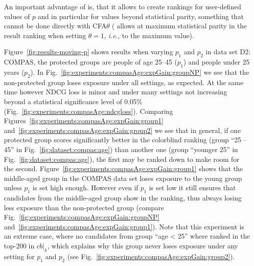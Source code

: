 
%
An important advantage of \algoFAIR is, that it allows to create rankings for user-defined values of $p$ and in particular for values beyond statistical parity, something that cannot be done directly with CFA$\theta$ (\citet{zehlike2020matching} allows at maximum statistical parity in the result ranking when setting $\theta=1$, {\it i.e.}, to the maximum value).

Figure~\ref{fig:results-moving-p} shows results when varying $p_1$ and $p_2$ in data set D2: COMPAS, the protected groups are people of age 25--45 ($p_1$) and people under 25 years ($p_2$).
%
In Fig.~\ref{fig:experiments:compasAge:expGain:groupNP} we see that the non-protected group loses exposure under all settings, as expected.
%
At the same time however NDCG loss is minor and under many settings not increasing beyond a statistical significance level of 0.05\% (Fig.~\ref{fig:experiments:compasAge:ndcgloss}).
%
Comparing Figures~\ref{fig:experiments:compasAge:expGain:group1} and~\ref{fig:experiments:compasAge:expGain:group2} we see that in general, if one protected group scores significantly better in the colorblind ranking (group ``25 -- 45'' in Fig.~\ref{fig:dataset:compas:age}) than another one (group ``younger 25'' in Fig.~\ref{fig:dataset:compas:age}), the first may be ranked down to make room for the second.
%
Figure~\ref{fig:experiments:compasAge:expGain:group1} shows that the middle-aged group in the COMPAS data set loses exposure to the young group unless $p_1$ is set high enough.
%
However even if $p_1$ is set low it still ensures that candidates from the middle-aged group show in the ranking, thus always losing less exposure than the non-protected group (compare Fig.~\ref{fig:experiments:compasAge:expGain:groupNP} and~\ref{fig:experiments:compasAge:expGain:group1}).
%
Note that this experiment is an extreme case, where no candidates from group ``age < 25'' where ranked in the top-200 in $cb|_k$, which explains why this group never loses exposure under any setting for $p_1$ and $p_2$ (see Fig.~\ref{fig:experiments:compasAge:expGain:group2}).

